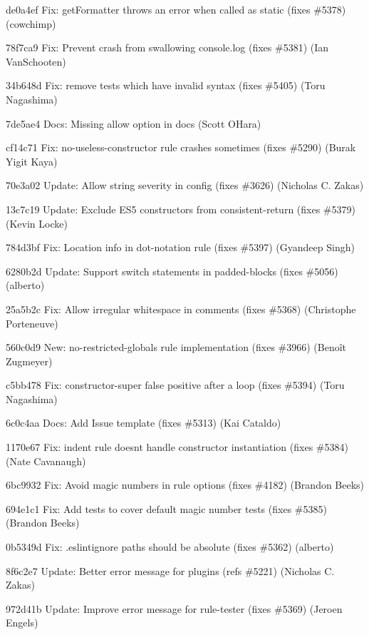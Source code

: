 \begin{DoxyItemize}
\item de0a4ef Fix\+: {\ttfamily get\+Formatter} throws an error when called as static (fixes \#5378) (cowchimp)
\item 78f7ca9 Fix\+: Prevent crash from swallowing console.\+log (fixes \#5381) (Ian Van\+Schooten)
\item 34b648d Fix\+: remove tests which have invalid syntax (fixes \#5405) (Toru Nagashima)
\item 7de5ae4 Docs\+: Missing allow option in docs (Scott O\textquotesingle{}Hara)
\item cf14c71 Fix\+: {\ttfamily no-\/useless-\/constructor} rule crashes sometimes (fixes \#5290) (Burak Yigit Kaya)
\item 70e3a02 Update\+: Allow string severity in config (fixes \#3626) (Nicholas C. Zakas)
\item 13c7c19 Update\+: Exclude E\+S5 constructors from consistent-\/return (fixes \#5379) (Kevin Locke)
\item 784d3bf Fix\+: Location info in {\ttfamily dot-\/notation} rule (fixes \#5397) (Gyandeep Singh)
\item 6280b2d Update\+: Support switch statements in padded-\/blocks (fixes \#5056) (alberto)
\item 25a5b2c Fix\+: Allow irregular whitespace in comments (fixes \#5368) (Christophe Porteneuve)
\item 560c0d9 New\+: no-\/restricted-\/globals rule implementation (fixes \#3966) (Benoît Zugmeyer)
\item c5bb478 Fix\+: {\ttfamily constructor-\/super} false positive after a loop (fixes \#5394) (Toru Nagashima)
\item 6c0c4aa Docs\+: Add Issue template (fixes \#5313) (Kai Cataldo)
\item 1170e67 Fix\+: indent rule doesn\textquotesingle{}t handle constructor instantiation (fixes \#5384) (Nate Cavanaugh)
\item 6bc9932 Fix\+: Avoid magic numbers in rule options (fixes \#4182) (Brandon Beeks)
\item 694e1c1 Fix\+: Add tests to cover default magic number tests (fixes \#5385) (Brandon Beeks)
\item 0b5349d Fix\+: .eslintignore paths should be absolute (fixes \#5362) (alberto)
\item 8f6c2e7 Update\+: Better error message for plugins (refs \#5221) (Nicholas C. Zakas)
\item 972d41b Update\+: Improve error message for rule-\/tester (fixes \#5369) (Jeroen Engels)

\end{DoxyItemize}
